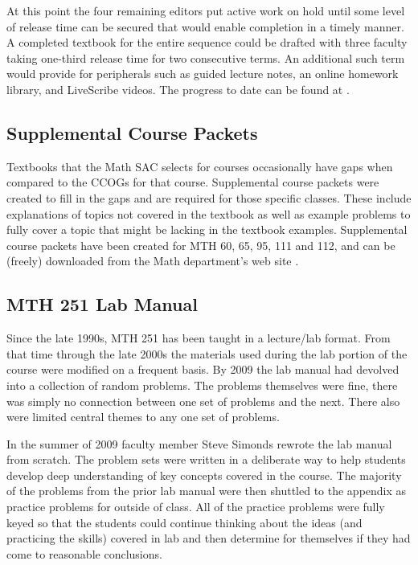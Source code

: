 At this point the four remaining editors put active work on hold until some level of
release time can be secured that would enable completion in a timely manner.  A
completed textbook for the entire sequence could be drafted with three faculty
taking one-third release time for two consecutive terms.  An additional such
term would provide for peripherals such as guided lecture notes, an online
homework library, and LiveScribe videos. The progress to date can be found at
\cite{mth111project}.
 
\subsection{Supplemental Course Packets}
Textbooks that the Math SAC selects for courses occasionally have gaps when
compared to the CCOGs for that course.  Supplemental course packets were created
to fill in the gaps and are required for those specific classes.  These include
explanations of topics not covered in the textbook as well as example
problems to fully cover a topic that might be lacking in the textbook examples.
Supplemental course packets have been created for MTH 60, 65, 95, 111 and 112,
and can be (freely) downloaded from the Math department's web site
\cite{pccmathdept}.
 
\subsection{MTH 251 Lab Manual}
Since the late 1990s, MTH 251 has been taught in a lecture/lab format.  From
that time through the late 2000s the materials used during the lab portion of
the course were modified on a frequent basis.  By 2009 the lab manual had
devolved into a collection of random problems.  The problems themselves were
fine, there was simply no connection between one set of problems and the next.
There also were limited central themes to any one set of problems.

In the summer of 2009 faculty member Steve Simonds rewrote the lab manual from
scratch.  The problem sets were written in a deliberate way to help students
develop deep understanding of key concepts covered in the course.  The majority
of the problems from the prior lab manual were then shuttled to the appendix as
practice problems for outside of class.  All of the practice problems were fully
keyed so that the students could continue thinking about the ideas (and
practicing the skills) covered in lab and then determine for themselves if they
had come to reasonable conclusions.

